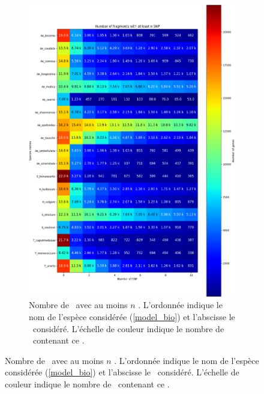\documentclass[../main]{subfiles} %
\begin{document}
\addto\extrasfrench{\protected\edef:{\unexpanded\expandafter{:}}}

\begin{landscape}
\begin{figure}[p]
    \centering
    \begin{subfigure}[b]{0.55\paperwidth}
        \centering
        \includegraphics[width=\textwidth]{../Illustrations/Classic_Heatmap_SNP.png}
        \caption{Nombre de \contigs avec au moins $n$ \SNP. L'ordonnée indique le nom de l'espèce considérée (\ref{model_bio}) et l'abscisse le \NbSNP considéré. L'échelle de couleur indique le nombre de \contigs contenant ce \NbSNP.\\
}
\end{subfigure}
\end{figure}
\end{landscape}
\end{document}
